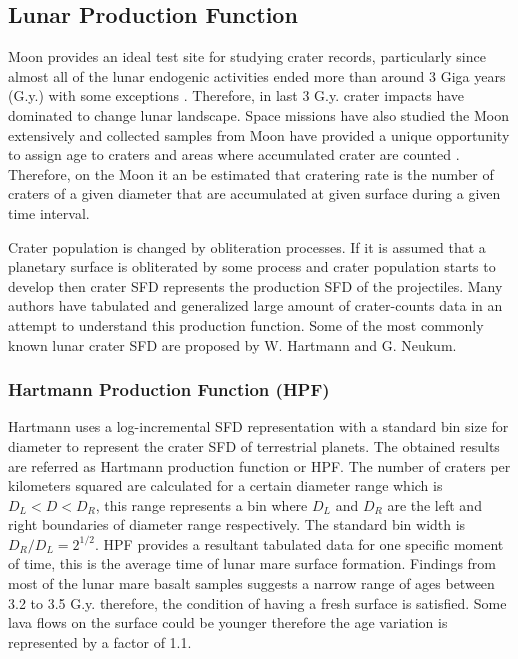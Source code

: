 \documentclass[11pt]{article}
\begin{document}

\subsection{Lunar Production Function}
Moon provides an ideal test site for studying crater records, particularly since almost all of the lunar endogenic activities ended more than around 3 Giga years (G.y.) with some exceptions \cite{hiesinger2000ages}. Therefore, in last 3 G.y. crater impacts have dominated to change lunar landscape. Space missions have also studied the Moon extensively and collected samples from Moon have provided a unique opportunity to assign age to craters and areas where accumulated crater are counted \cite{stoffler2001stratigraphy}. Therefore, on the Moon it an be estimated that cratering rate is the number of craters of a given diameter that are accumulated at given surface during a given time interval.

Crater population is changed by obliteration processes. If it is assumed that a planetary surface is obliterated by some process and crater population starts to develop then crater SFD represents the production SFD of the projectiles. Many authors have tabulated and generalized large amount of crater-counts data in an attempt to understand this production function. Some of the most commonly known lunar crater SFD are proposed by W. Hartmann and G. Neukum. 

\subsubsection{Hartmann Production Function (HPF)}
Hartmann uses a log-incremental SFD representation with a standard bin size for diameter to represent the crater SFD of terrestrial planets. The obtained results are referred as Hartmann production function or HPF. The number of craters per kilometers squared are calculated for a certain diameter range which is $D_{L} < D < D_{R}$, this range represents a bin where $D_{L}$ and $D_{R}$ are the left and right boundaries of diameter range respectively. The standard bin width is $D_{R}/D_{L} = 2^{1/2}$. HPF provides a resultant tabulated data for one specific moment of time, this is the average time of lunar mare surface formation. Findings from most of the lunar mare basalt samples suggests a narrow range of ages between 3.2 to 3.5 G.y. \cite{stoffler2001stratigraphy} therefore, the condition of having a fresh surface is satisfied. Some lava flows on the surface could be younger \cite{hiesinger2000ages} therefore the age variation is represented by a factor of 1.1.
\end{document}
